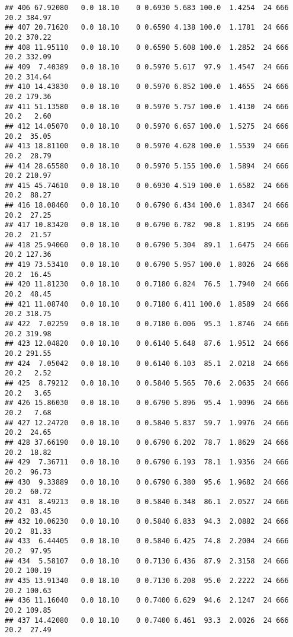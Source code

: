 \documentclass[
]{article}
\begin{document}
\begin{verbatim}
## 406 67.92080   0.0 18.10    0 0.6930 5.683 100.0  1.4254  24 666    20.2 384.97
## 407 20.71620   0.0 18.10    0 0.6590 4.138 100.0  1.1781  24 666    20.2 370.22
## 408 11.95110   0.0 18.10    0 0.6590 5.608 100.0  1.2852  24 666    20.2 332.09
## 409  7.40389   0.0 18.10    0 0.5970 5.617  97.9  1.4547  24 666    20.2 314.64
## 410 14.43830   0.0 18.10    0 0.5970 6.852 100.0  1.4655  24 666    20.2 179.36
## 411 51.13580   0.0 18.10    0 0.5970 5.757 100.0  1.4130  24 666    20.2   2.60
## 412 14.05070   0.0 18.10    0 0.5970 6.657 100.0  1.5275  24 666    20.2  35.05
## 413 18.81100   0.0 18.10    0 0.5970 4.628 100.0  1.5539  24 666    20.2  28.79
## 414 28.65580   0.0 18.10    0 0.5970 5.155 100.0  1.5894  24 666    20.2 210.97
## 415 45.74610   0.0 18.10    0 0.6930 4.519 100.0  1.6582  24 666    20.2  88.27
## 416 18.08460   0.0 18.10    0 0.6790 6.434 100.0  1.8347  24 666    20.2  27.25
## 417 10.83420   0.0 18.10    0 0.6790 6.782  90.8  1.8195  24 666    20.2  21.57
## 418 25.94060   0.0 18.10    0 0.6790 5.304  89.1  1.6475  24 666    20.2 127.36
## 419 73.53410   0.0 18.10    0 0.6790 5.957 100.0  1.8026  24 666    20.2  16.45
## 420 11.81230   0.0 18.10    0 0.7180 6.824  76.5  1.7940  24 666    20.2  48.45
## 421 11.08740   0.0 18.10    0 0.7180 6.411 100.0  1.8589  24 666    20.2 318.75
## 422  7.02259   0.0 18.10    0 0.7180 6.006  95.3  1.8746  24 666    20.2 319.98
## 423 12.04820   0.0 18.10    0 0.6140 5.648  87.6  1.9512  24 666    20.2 291.55
## 424  7.05042   0.0 18.10    0 0.6140 6.103  85.1  2.0218  24 666    20.2   2.52
## 425  8.79212   0.0 18.10    0 0.5840 5.565  70.6  2.0635  24 666    20.2   3.65
## 426 15.86030   0.0 18.10    0 0.6790 5.896  95.4  1.9096  24 666    20.2   7.68
## 427 12.24720   0.0 18.10    0 0.5840 5.837  59.7  1.9976  24 666    20.2  24.65
## 428 37.66190   0.0 18.10    0 0.6790 6.202  78.7  1.8629  24 666    20.2  18.82
## 429  7.36711   0.0 18.10    0 0.6790 6.193  78.1  1.9356  24 666    20.2  96.73
## 430  9.33889   0.0 18.10    0 0.6790 6.380  95.6  1.9682  24 666    20.2  60.72
## 431  8.49213   0.0 18.10    0 0.5840 6.348  86.1  2.0527  24 666    20.2  83.45
## 432 10.06230   0.0 18.10    0 0.5840 6.833  94.3  2.0882  24 666    20.2  81.33
## 433  6.44405   0.0 18.10    0 0.5840 6.425  74.8  2.2004  24 666    20.2  97.95
## 434  5.58107   0.0 18.10    0 0.7130 6.436  87.9  2.3158  24 666    20.2 100.19
## 435 13.91340   0.0 18.10    0 0.7130 6.208  95.0  2.2222  24 666    20.2 100.63
## 436 11.16040   0.0 18.10    0 0.7400 6.629  94.6  2.1247  24 666    20.2 109.85
## 437 14.42080   0.0 18.10    0 0.7400 6.461  93.3  2.0026  24 666    20.2  27.49

\end{verbatim}
\end{document}
